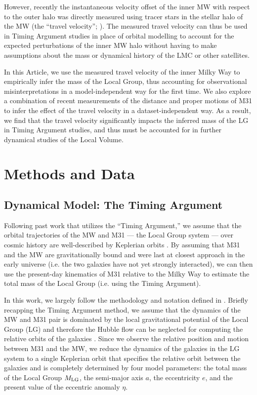 \documentclass[twocolumn]{aastex631}
\newcommand{\mlg}{\ensuremath{M_{\rm LG}}}
\begin{document}
However, recently the instantaneous velocity offset of the inner MW with respect
to the outer halo was directly measured using tracer stars in the stellar halo
of the MW (the ``travel velocity''; \citealt{Petersen2021}).
The measured travel velocity can thus be used in Timing Argument studies in
place of orbital modelling to account for the expected perturbations of the
inner MW halo without having to make assumptions about the mass or dynamical
history of the LMC or other satellites.

In this Article, we use the measured travel velocity of the inner Milky Way to
empirically infer the mass of the Local Group, thus accounting for observational
misinterpretations in a model-independent way for the first time.
We also explore a combination of recent measurements of the distance and proper
motions of M31 to infer the effect of the travel velocity in a
dataset-independent way.
As a result, we find that the travel velocity significantly impacts the inferred
mass of the LG in Timing Argument studies, and thus must be accounted for in
further dynamical studies of the Local Volume.
\section{Methods and Data}

\subsection{Dynamical Model: The Timing Argument}
\label{sec:timingarg}
Following past work that utilizes the ``Timing Argument,'' we assume that the
orbital trajectories of the MW and M31 --- the Local Group system --- over
cosmic history are well-described by Keplerian orbits \citep[e.g.,][]{Kahn1959,
Lynden-Bell:1981, Kroeker1991, LiWhite2008, vdm2012, Penarrubia2016}.
By assuming that M31 and the MW are gravitationally bound and were last at
closest approach in the early universe (i.e. the two galaxies have not yet
strongly interacted), we can then use the present-day kinematics of M31 relative
to the Milky Way to estimate the total mass of the Local Group (i.e. using the
Timing Argument).

In this work, we largely follow the methodology and notation defined in
\citet{Penarrubia2016}.
Briefly recapping the Timing Argument method, we assume that the dynamics of the
MW and M31 pair is dominated by the local gravitational potential of the Local
Group (LG) and therefore the Hubble flow can be neglected for computing the
relative orbits of the galaxies \citep[see, e.g.,][]{Penarrubia2014}.
Since we observe the relative position and motion between M31 and the MW, we
reduce the dynamics of the galaxies in the LG system to a single Keplerian orbit
that specifies the relative orbit between the galaxies and is completely
determined by four model parameters: the total mass of the Local Group \mlg, the
semi-major axis $a$, the eccentricity $e$, and the present value of the
eccentric anomaly $\eta$.
\end{document}

